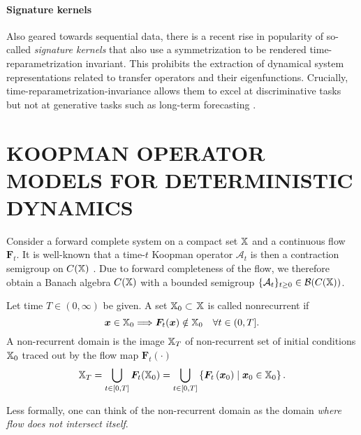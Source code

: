 \paragraph{Signature kernels}
Also geared towards sequential data, there is a recent rise in popularity of so-called \textit{signature kernels} \citep{Kiraly2016KernelsData, Lee2023TheKernel,Salvi2021ThePDE, Lemercier2021SigGPDE:Data} that also use a symmetrization to be rendered time-reparametrization invariant. This prohibits the extraction of dynamical system representations related to transfer operators and their eigenfunctions. Crucially, time-reparametrization-invariance allows them to excel at discriminative tasks \citep{Lemercier2021SigGPDE:Data,Salvi2021ThePDE} but not at generative tasks such as long-term forecasting \citep{KKR_neurips2023}.


\section{KOOPMAN OPERATOR MODELS FOR DETERMINISTIC DYNAMICS}\label{supl:koop}

\begin{remark}\label{rmk:bounded}
    Consider a forward complete system on a compact set $\mathbb{X}$ and a continuous flow $\bm{F}_{t}$. It is well-known that a  time-$t$ Koopman operator $\mathcal{A}_t$ is then a contraction semigroup on ${C}(\mathbb{X})$ \citep{Kreidler2018CompactSystems}. Due to forward completeness of the flow, we therefore obtain a Banach algebra ${C}(\mathbb{X})$ with a bounded semigroup $\{\mathcal{A}_t\}_{t\geq0} \in \mathcal{B}({C}(\mathbb{X}))$.%
\end{remark}

\begin{definition}\label{def:Nonrec}
Let time \(T \in(0, \infty)\) be given. A set \(\mathbb{X}_0\subset\) \(\mathbb{X}\) is called nonrecurrent if
\[
\bm{x}\in \mathbb{X}_0 \Longrightarrow \bm{F}_t(\bm{x}) \notin \mathbb{X}_0 \quad \forall t \in(0, T].
\]
A non-recurrent domain is the image $\mathbb{X}_{T}$ of non-recurrent set of initial conditions $\mathbb{X}_0$ traced out by the flow map $\bm{F}_t(\cdot)$
\[
\mathbb{X}_{T}=\bigcup_{t \in[0, T]} \bm{F}_t(\mathbb{X}_0)=\bigcup_{t \in[0, T]}\left\{\bm{F}_t\left(\bm{x}_{0}\right) \mid \bm{x}_{0} \in\mathbb{X}_0\right\}.
\]
\end{definition}

Less formally, one can think of the non-recurrent domain as the domain \emph{where flow does not intersect itself}.

